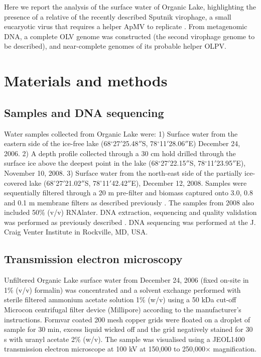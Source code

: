 Here we report the analysis of the surface water of Organic Lake, highlighting the presence of a relative of the recently described Sputnik virophage, a small eucaryotic virus that requires a helper \ac{ApMV} to replicate \cite{LaScola2008}. 
From metagenomic \textsc{DNA}, a complete \ac{OLV} genome was constructed (the second virophage genome to be described), and near-complete genomes of its probable helper \ac{OLPV}.


\section{Materials and methods}

\subsection{Samples and DNA sequencing}
Water samples collected from Organic Lake were: 1) Surface water from the eastern side of the ice-free lake (68$^{\circ}$27$'$25.48$''$S, 78$^{\circ}$11$'$28.06$''$E) December 24, 2006.
2) A depth profile collected through a 30 cm hold drilled through the surface ice above the deepest point in the lake (68$^{\circ}$27$'$22.15$''$S, 78$^{\circ}$11$'$23.95$''$E), November 10, 2008. 
3) Surface water from the north-east side of the partially ice-covered lake (68$^{\circ}$27$'$21.02$''$S, 78$^{\circ}$11$'$42.42$''$E), December 12, 2008. 
Samples were sequentially filtered through a 20 \textmu{}m pre-filter and biomass captured onto 3.0, 0.8 and 0.1 \textmu{}m membrane filters as described previously \cite{Ng2010a, Lauro2011}. 
The samples from 2008 also included 50\% (v/v) \textsc{RNA}later. 
DNA extraction, sequencing and quality validation was performed as previously described \cite{Ng2010a, Lauro2011}. 
DNA sequencing was performed at the J. Craig Venter Institute in Rockville, \textsc{MD}, \textsc{USA}.  

\subsection{Transmission electron microscopy}
Unfiltered Organic Lake surface water from December 24, 2006 (fixed on-site in 1\% (v/v) formalin) was concentrated and a solvent exchange performed with sterile filtered ammonium acetate solution 1\% (w/v) using a 50 kDa cut-off Microcon centrifugal filter device (Millipore) according to the manufacturer’s instructions. 
Formvar coated 200 mesh copper grids were floated on a droplet of sample for 30 min, excess liquid wicked off and the grid negatively stained for 30 s with uranyl acetate 2\% (w/v). 
The sample was visualised using a \textsc{JEOL1400} transmission electron microscope at 100 kV at 150,000 to 250,000$\times$ magnification.

